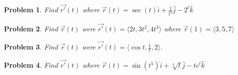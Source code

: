 \documentclass[11pt]{article}
\newtheorem{problem}{Problem}
\begin{document}
\begin{problem}
    Find $\vec{r'}(t)$ where $\vec{r}(t) = \sec(t)\hat{i} + \frac{1}{t^5}\hat{j}-2^t\hat{k}$
\end{problem}

\begin{problem}
    Find $\vec{r}(t)$ were $\vec{r'}(t) = \langle 2t, 3t^2, 4t^3 \rangle$ where $\vec{r}(1) = \langle 3,5,7\rangle$
\end{problem}

\begin{problem}
    Find $\vec{r}(t)$ were $\vec{r'}(t) = \langle \cos{t}, \frac{1}{t}, 2 \rangle$.
\end{problem}

\begin{problem}
    Find $\vec{r'}(t)$ where $\vec{r}(t) = \sin(t^5)\hat{i} + \sqrt[3]{t}\hat{j}-te^t\hat{k}$
\end{problem}
\end{document}
